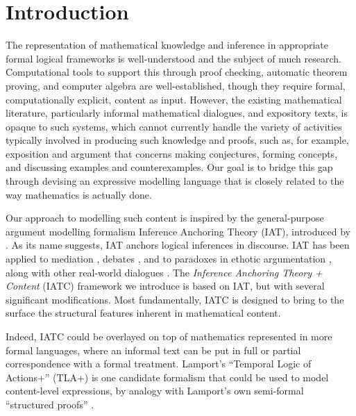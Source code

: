 \documentclass[smallextended,oneside]{svjour3}       %
\let\cite\citep
\begin{document}
\clearpage

\section{Introduction}\label{intro}

The representation of mathematical knowledge and inference in appropriate formal logical frameworks is well-understood and the subject of much research. Computational tools to support this through proof checking, automatic theorem proving, and computer algebra are well-established, though they require  formal, computationally explicit, content as input. However, the existing mathematical literature, particularly informal mathematical dialogues, and expository texts, is opaque to such systems, which  cannot currently handle  the variety of activities typically involved in producing such knowledge and proofs, such as, for example, exposition and argument that concerns making conjectures, forming concepts, and discussing  examples and counterexamples.  Our goal is to bridge this gap through devising an expressive modelling language that is closely related to the way mathematics is actually done.

Our approach to modelling such content is inspired by the general-purpose argument modelling formalism Inference Anchoring Theory (IAT), introduced by \citet{reed2011dialogues}. As its name suggests, IAT anchors logical inferences in discourse. IAT has been applied to mediation 
\cite{janier2017towards}, debates \cite{budzynska2014model}, and to paradoxes in ethotic argumentation \cite{budzynska2013circularity}, along with other real-world dialogues \cite{budzynska2013towards}. The \emph{Inference Anchoring Theory + Content} (IATC) framework we introduce is based on IAT, but with several significant modifications.  Most fundamentally, IATC is designed to bring to the surface the structural features inherent in mathematical content.

Indeed, IATC could be overlayed on top of mathematics represented in more formal languages, where an informal text can be put in full or partial correspondence with a formal treatment. Lamport's ``Temporal Logic of Actions+'' (TLA+) \cite{lamport1999specifying,lamport2014tla2} is one candidate formalism that could be used to model content-level expressions, by analogy with Lamport's own semi-formal ``structured proofs'' 
\cite{lamport1995write,lamport2012write21st}.
\end{document}
